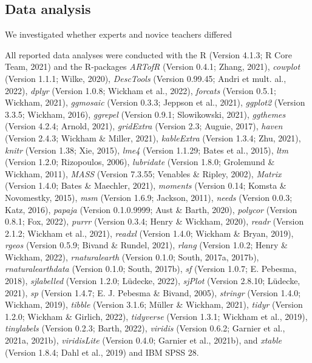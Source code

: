 \documentclass[
  man]{apa6}
\begin{document}
\hypertarget{data-analysis}{%
\subsection{Data analysis}\label{data-analysis}}

We investigated whether experts and novice teachers differed

All reported data analyses were conducted with the R (Version 4.1.3; R Core Team, 2021) and the R-packages \emph{ARTofR} (Version 0.4.1; Zhang, 2021), \emph{cowplot} (Version 1.1.1; Wilke, 2020), \emph{DescTools} (Version 0.99.45; Andri et mult. al., 2022), \emph{dplyr} (Version 1.0.8; Wickham et al., 2022), \emph{forcats} (Version 0.5.1; Wickham, 2021), \emph{ggmosaic} (Version 0.3.3; Jeppson et al., 2021), \emph{ggplot2} (Version 3.3.5; Wickham, 2016), \emph{ggrepel} (Version 0.9.1; Slowikowski, 2021), \emph{ggthemes} (Version 4.2.4; Arnold, 2021), \emph{gridExtra} (Version 2.3; Auguie, 2017), \emph{haven} (Version 2.4.3; Wickham \& Miller, 2021), \emph{kableExtra} (Version 1.3.4; Zhu, 2021), \emph{knitr} (Version 1.38; Xie, 2015), \emph{lme4} (Version 1.1.29; Bates et al., 2015), \emph{ltm} (Version 1.2.0; Rizopoulos, 2006), \emph{lubridate} (Version 1.8.0; Grolemund \& Wickham, 2011), \emph{MASS} (Version 7.3.55; Venables \& Ripley, 2002), \emph{Matrix} (Version 1.4.0; Bates \& Maechler, 2021), \emph{moments} (Version 0.14; Komsta \& Novomestky, 2015), \emph{msm} (Version 1.6.9; Jackson, 2011), \emph{needs} (Version 0.0.3; Katz, 2016), \emph{papaja} (Version 0.1.0.9999; Aust \& Barth, 2020), \emph{polycor} (Version 0.8.1; Fox, 2022), \emph{purrr} (Version 0.3.4; Henry \& Wickham, 2020), \emph{readr} (Version 2.1.2; Wickham et al., 2021), \emph{readxl} (Version 1.4.0; Wickham \& Bryan, 2019), \emph{rgeos} (Version 0.5.9; Bivand \& Rundel, 2021), \emph{rlang} (Version 1.0.2; Henry \& Wickham, 2022), \emph{rnaturalearth} (Version 0.1.0; South, 2017a, 2017b), \emph{rnaturalearthdata} (Version 0.1.0; South, 2017b), \emph{sf} (Version 1.0.7; E. Pebesma, 2018), \emph{sjlabelled} (Version 1.2.0; Lüdecke, 2022), \emph{sjPlot} (Version 2.8.10; Lüdecke, 2021), \emph{sp} (Version 1.4.7; E. J. Pebesma \& Bivand, 2005), \emph{stringr} (Version 1.4.0; Wickham, 2019), \emph{tibble} (Version 3.1.6; Müller \& Wickham, 2021), \emph{tidyr} (Version 1.2.0; Wickham \& Girlich, 2022), \emph{tidyverse} (Version 1.3.1; Wickham et al., 2019), \emph{tinylabels} (Version 0.2.3; Barth, 2022), \emph{viridis} (Version 0.6.2; Garnier et al., 2021a, 2021b), \emph{viridisLite} (Version 0.4.0; Garnier et al., 2021b), and \emph{xtable} (Version 1.8.4; Dahl et al., 2019) and IBM SPSS 28.
\end{document}
